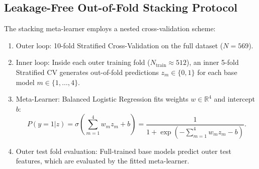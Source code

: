 \subsection{Leakage-Free Out-of-Fold Stacking Protocol}
The stacking meta-learner employs a nested cross-validation scheme:
\begin{enumerate}[leftmargin=*]
  \item Outer loop: 10-fold Stratified Cross-Validation on the full dataset ($N=569$).
  \item Inner loop: Inside each outer training fold ($N_{\mathrm{train}} \approx 512$), an inner 5-fold Stratified CV generates out-of-fold predictions $z_m \in \{0, 1\}$ for each base model $m \in \{1, \dots, 4\}$.
  \item Meta-Learner: Balanced Logistic Regression fits weights $w \in \mathbb{R}^4$ and intercept $b$:
  \begin{equation}
  P(y = 1 | z) = \sigma\left(\sum_{m=1}^4 w_m z_m + b\right) = \frac{1}{1 + \exp\left(-\sum_{m=1}^4 w_m z_m - b\right)}.
  \end{equation}
  \item Outer test fold evaluation: Full-trained base models predict outer test features, which are evaluated by the fitted meta-learner.
\end{enumerate}

